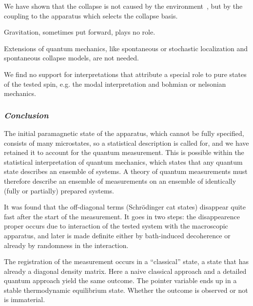 \documentclass[aps,prb,floatfix,twocolumn]{revtex4}
\begin{document}
We have shown that the  collapse is not caused by the environment~\cite{Zurek}, 
but  by the coupling to the apparatus which selects the  collapse basis. 

Gravitation, sometimes put forward, plays no role.

Extensions of quantum mechanics, like spontaneous or stochastic 
localization and spontaneous  collapse models,  are not needed.


We find no support for interpretations that attribute a special role 
to pure states of the tested spin, e.g. the modal interpretation
and bohmian or nelsonian mechanics.


\subsubsection*{\it Conclusion}

The initial paramagnetic state of the apparatus, which cannot be fully specified, 
consists of many microstates, so a statistical description is called for, and we have 
retained it to account for the quantum measurement. This is 
possible within the statistical interpretation of quantum mechanics, which 
states that any quantum state describes an ensemble of systems.
A theory of quantum measurements must therefore describe an ensemble of measurements 
on an ensemble of identically (fully or partially) prepared systems.

It was found that the off-diagonal terms (Schr\"odinger cat states) disappear quite fast 
after the start of the measurement. It goes in two steps: the
disappearence proper occurs due to interaction 
of the tested system with the macroscopic apparatus, and later is made definite 
either by bath-induced decoherence or already by randomness in the interaction.


The registration of the measurement occurs in a ``classical'' state,
a state that has already a diagonal density matrix. 
Here a naive classical approach and a detailed quantum 
approach yield the same outcome. The pointer variable ends up in a 
stable thermodynamic equilibrium state. 
Whether the outcome is observed or not is immaterial.
\end{document}
